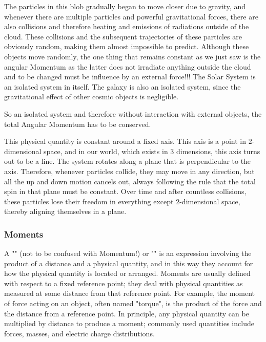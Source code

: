 	The particles in this blob gradually began to move closer due to gravity, and whenever there are multiple particles and powerful gravitational forces, there are also collisions and therefore heating and emissions of radiations outside of the cloud. These collisions and the subsequent trajectories of these particles are obviously random, making them  almost impossible to predict. Although these objects move randomly, the one thing that remains constant as we just saw is the angular Momentum as the latter does not irradiate anything outside the cloud and to be changed must be influence by an external force!!! The Solar System is an isolated system in itself. The galaxy is also an isolated system, since the gravitational effect of other cosmic objects is negligible.

	So an isolated system and therefore without interaction with external objects, the total Angular Momentum has to be conserved.

	This physical quantity is constant around a fixed axis. This axis is a point in $2$-dimensional space, and in our world, which exists in $3$ dimensions, this axis turns out to be a line. The system rotates along a plane that is perpendicular to the axis. Therefore, whenever particles collide, they may move in any direction, but all the up and down motion cancels out, always following the rule that the total spin in that plane must be constant. Over time and after countless collisions, these particles lose their freedom in everything except 2-dimensional space, thereby aligning themselves in a plane.
	
	\subsubsection{Moments}
	 A "" (not to be confused with Momentum!) or "" is an expression involving the product of a distance and a physical quantity, and in this way they account for how the physical quantity is located or arranged. Moments are usually defined with respect to a fixed reference point; they deal with physical quantities as measured at some distance from that reference point. For example, the moment of force acting on an object, often named "torque", is the product of the force and the distance from a reference point. In principle, any physical quantity can be multiplied by distance to produce a moment; commonly used quantities include forces, masses, and electric charge distributions.
	 
